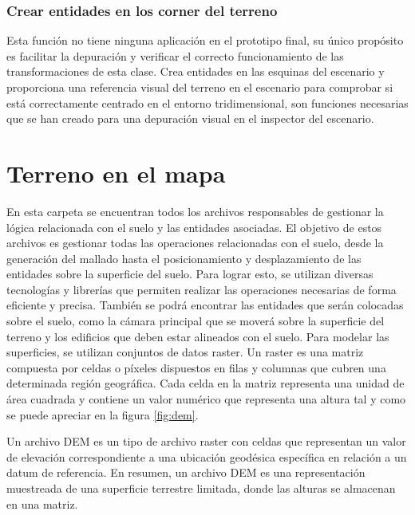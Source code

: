 \documentclass[a4paper, 11pt]{book}
\begin{document}
\subsubsection{Crear entidades en los corner del terreno}
\label{funcion:createCorner}
Esta función no tiene ninguna aplicación en el prototipo final, su único propósito es facilitar la depuración y verificar el correcto funcionamiento de las transformaciones de esta clase. Crea entidades en las esquinas del escenario y proporciona una referencia visual del terreno en el escenario para comprobar si está correctamente centrado en el entorno tridimensional, son funciones necesarias que se han creado para una depuración visual en el inspector del escenario.
\clearpage
\section{Terreno en el mapa}
\label{sec:mapGround}
En esta carpeta se encuentran todos los archivos responsables de gestionar la lógica relacionada con el suelo y las entidades asociadas. El objetivo de estos archivos es gestionar todas las operaciones relacionadas con el suelo, desde la generación del mallado hasta el posicionamiento y desplazamiento de las entidades sobre la superficie del suelo. Para lograr esto, se utilizan diversas tecnologías y librerías que permiten realizar las operaciones necesarias de forma eficiente y precisa.
También se podrá encontrar las entidades que serán colocadas sobre el suelo, como la cámara principal que se moverá sobre la superficie del terreno y los edificios que deben estar alineados con el suelo. Para modelar las superficies, se utilizan conjuntos de datos \gls{raster}. Un raster es una matriz compuesta por celdas o píxeles dispuestos en filas y columnas que cubren una determinada región geográfica.
Cada celda en la matriz representa una unidad de área cuadrada y contiene un valor numérico que representa una altura tal y como se puede apreciar en la figura \ref{fig:dem}.

Un archivo DEM es un tipo de archivo raster con celdas que representan un valor de elevación correspondiente a una ubicación geodésica específica en relación a un \gls{datum} de referencia. En resumen, un archivo DEM es una representación muestreada de una superficie terrestre limitada, donde las alturas se almacenan en una matriz.
\end{document}
